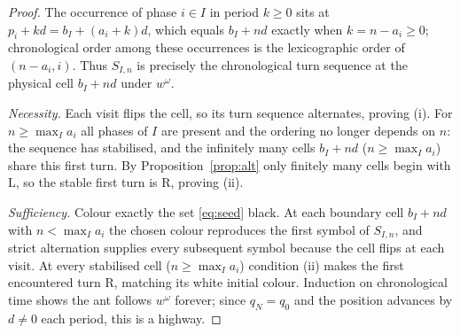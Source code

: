 \documentclass[11pt,reqno]{amsart}
\theoremstyle{plain}
\theoremstyle{definition}
\newcommand{\drift}{d}
\newcommand{\turnR}{\mathrm{R}}
\newcommand{\turnL}{\mathrm{L}}
\begin{document}
\begin{proof}
The occurrence of phase $i\in I$ in period $k\ge0$ sits at
$p_i+k\drift=b_I+(a_i+k)\drift$, which equals $b_I+n\drift$ exactly when $k=n-a_i\ge0$;
chronological order among these occurrences is the lexicographic order of $(n-a_i,i)$.
Thus $S_{I,n}$ is precisely the chronological turn sequence at the physical cell
$b_I+n\drift$ under $w^\omega$.

\emph{Necessity.} Each visit flips the cell, so its turn sequence alternates,
proving (i). For $n\ge\max_I a_i$ all phases of $I$ are present and the ordering no
longer depends on $n$: the sequence has stabilised, and the infinitely many cells
$b_I+n\drift$ ($n\ge\max_I a_i$) share this first turn. By Proposition~\ref{prop:alt}
only finitely many cells begin with $\turnL$, so the stable first turn is $\turnR$,
proving (ii).

\emph{Sufficiency.} Colour exactly the set \eqref{eq:seed} black. At each boundary
cell $b_I+n\drift$ with $n<\max_I a_i$ the chosen colour reproduces the first symbol
of $S_{I,n}$, and strict alternation supplies every subsequent symbol because the
cell flips at each visit. At every stabilised cell ($n\ge\max_I a_i$) condition (ii)
makes the first encountered turn $\turnR$, matching its white initial colour.
Induction on chronological time shows the ant follows $w^\omega$ forever; since
$q_N=q_0$ and the position advances by $\drift\neq0$ each period, this is a highway.
\end{proof}
\end{document}
